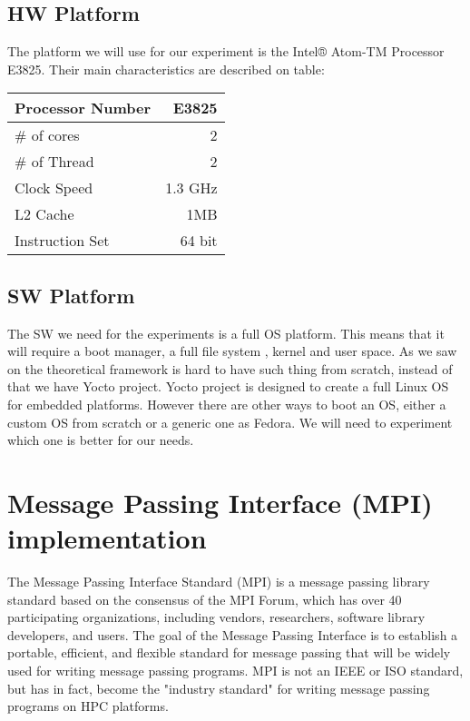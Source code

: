     \subsection{HW Platform} 
    The platform we will use for our experiment is the Intel® Atom-TM Processor
    E3825. Their main characteristics are described on table:

    \begin{center}
    \begin{tabular}{ | l | r |}
        \hline
        Processor Number & E3825  \\ \hline
        \# of cores & 2  \\ \hline
        \# of Thread & 2  \\ \hline
        Clock Speed & 1.3 GHz  \\ \hline
        L2 Cache & 1MB  \\ \hline
        Instruction Set & 64 bit  \\ \hline
    \end{tabular}
     \label{tab:title} 
    \end{center}


    \subsection{SW Platform} 
    The SW we need for the experiments is a full OS platform. This means that
    it will require a boot manager, a full file system , kernel and user space.
    As we saw on the theoretical framework is hard to have such thing from
    scratch, instead of that we have Yocto project. Yocto project is designed
    to create a full Linux OS for embedded platforms. However there are other
    ways to boot an OS, either a custom OS from scratch or a generic one as
    Fedora. We will need to experiment which one is better for our needs.

\section{Message Passing Interface (MPI) implementation}
\noindent

The Message Passing Interface Standard (MPI) is a message passing library
standard based on the consensus of the MPI Forum, which has over 40
participating organizations, including vendors, researchers, software library
developers, and users. The goal of the Message Passing Interface is to
establish a portable, efficient, and flexible standard for message passing
that will be widely used for writing message passing programs. MPI is not an IEEE
or ISO standard, but has in fact, become the "industry standard" for writing
message passing programs on HPC platforms. 

